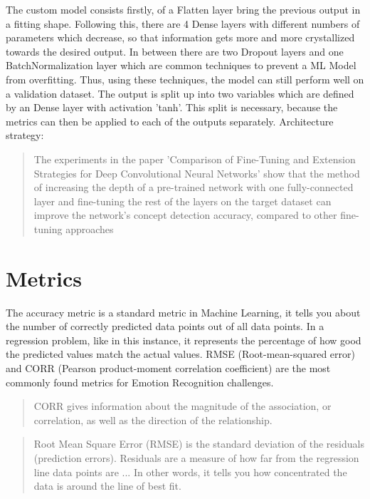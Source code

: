 The custom model consists firstly, of a Flatten layer bring the previous output in a fitting shape. Following this, there are 4 Dense layers with different numbers of parameters which decrease, so that information gets more and more crystallized towards the desired output. In between there are two Dropout layers and one BatchNormalization layer which are common techniques to prevent a ML Model from overfitting. Thus, using these techniques, the model can still perform well on a validation dataset.
\newline\newline
The output is split up into two variables which are defined by an Dense layer with activation 'tanh'. This split is necessary, because the metrics can then be applied to each of the outputs separately.
\newline\newline
Architecture strategy:
\begin{quote}
    The experiments in the paper 'Comparison of Fine-Tuning and Extension Strategies for Deep Convolutional Neural Networks' \cite{Pittaras:2017:FineTuningStrategiesComparison} show that the method of increasing the depth of a pre-trained network with one fully-connected layer and fine-tuning the rest of the layers on the target dataset can improve the network’s concept detection accuracy, compared to other fine-tuning approaches
\end{quote}


\section{Metrics}
The accuracy metric is a standard metric in Machine Learning, it tells you about the number of correctly predicted data points out of all data points. In a regression problem, like in this instance, it represents the percentage of how good the predicted values match the actual values.
\newline\newline
RMSE (Root-mean-squared error) and CORR (Pearson product-moment correlation coefficient) are the most commonly found metrics for Emotion Recognition challenges. 

\begin{quote}
    CORR gives information about the magnitude of the association, or correlation, as well as the direction of the relationship. \cite{2020:PearsonCorrelation}
\end{quote}

\begin{quote}
    Root Mean Square Error (RMSE) is the standard deviation of the residuals (prediction errors). Residuals are a measure of how far from the regression line data points are ... In other words, it tells you how concentrated the data is around the line of best fit. \cite{2020:RMSE}
\end{quote}

